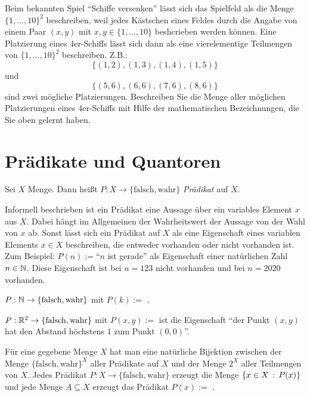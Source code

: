 \begin{aufg}
	Beim bekannten Spiel ``Schiffe versenken'' lässt sich das Spielfeld als die Menge $\{1,\ldots,10\}^2$ beschreiben, weil jedes Kästschen eines Feldes durch die Angabe von einem Paar $(x,y)$ mit $x,y \in \{1,\ldots,10\}$  beshcrieben werden können. Eine Platzierung eines 4er-Schiffs lässt sich dann als eine vierelementige Teilmengen von $\{1,\ldots,10\}^2$ beschreiben. Z.B.: 
	\[ \{(1,2), (1,3),(1,4),(1,5)\}
	\] und 
	\[ \{(5,6),(6,6),(7,6),(8,6)\}
	\] sind zwei mögliche Platzierungen. Beschreiben Sie die Menge aller möglichen Platzierungen eines 4er-Schiffs mit Hilfe der mathematischen Bezeichnungen, die Sie oben gelernt haben. 
\end{aufg} 


\section{Prädikate und Quantoren}


\begin{defn}
Sei $ X $ Menge. Dann heißt $ P : X \to \{ \text{falsch},\text{wahr} \} $ \emph{Prädikat} auf $ X $. 
\end{defn} 

\begin{bem}
	Informell beschrieben ist ein Prädikat eine Aussage über ein variables Element $x$ aus $X$. Dabei hängt im Allgemeinen der Wahrheitswert der Aussage von der Wahl von $x$ ab.  Sonst lässt sich ein Prädikat auf $X$ als eine Eigenschaft eines variablen Elements $x \in X$ beschreiben, die entweder vorhanden oder nicht vorhanden ist. Zum Beispiel: $P(n):=$``$n$ ist gerade'' als Eigenschaft einer natürlichen Zahl $n \in \mathbb{N}$. Diese Eigenschaft ist bei $n=123$ nicht vorhanden und bei $n=2020$ vorhanden. 
\end{bem}

\begin{bsp}
$ P : \mathbb{N} \to \{ \text{falsch},\text{wahr} \}$ mit $P(k) := $ .
\end{bsp} 

\begin{bsp}
$ P : \mathbb{R}^2 \to \{ \text{falsch},\text{wahr} \}$ mit $P(x,y) := $  ist die Eigenschaft  ``der Punkt $(x,y)$ hat den Abstand höchstens $1$ zum Punkt $(0,0)$''. 
\end{bsp} 

\begin{bem} 
	Für eine gegebene Menge $X$ hat man eine natürliche Bijektion zwischen der Menge $ \{ \text{falsch},\text{wahr} \}^X$ aller Prädikate auf $X$ und der Menge $2^X$ aller Teilmengen von $X$. Jedes Prädikat $P : X \to \{ \text{falsch},\text{wahr} \}$ erzeugt die Menge $\left\{ x \in X  \,:\, P(x) \right\}$ und jede Menge $A \subseteq X$ erzeugt das Prädikat $P (x) :=$ .
\end{bem} 


